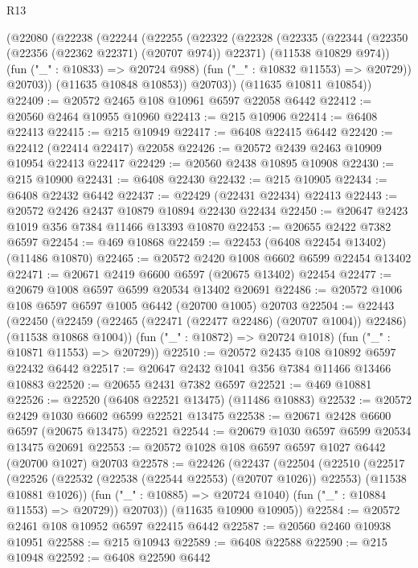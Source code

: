 \begin{lexlean}{R13}
\begin{coremodule}
    (@22080
      (@22238
        (@22244
          (@22255
            (@22322
              (@22328
                (@22335
                  (@22344
                    (@22350 (@22356 (@22362 @22371) (@20707 @974)) @22371)
                    (@11538 @10829 @974))
                  (fun ("_" : @10833) => @20724 @988)
                  (fun ("_" : @10832 @11553) => @20729))
                @20703))
            (@11635 @10848 @10853))
          @20703))
      (@11635 @10811 @10854))
@22409 := @20572 @2465 @108 @10961 @6597 @22058 @6442
@22412 := @20560 @2464 @10955 @10960
@22413 := @215 @10906
@22414 := @6408 @22413
@22415 := @215 @10949
@22417 := @6408 @22415 @6442
@22420 := @22412 (@22414 @22417) @22058
@22426 := @20572 @2439 @2463 @10909 @10954 @22413 @22417
@22429 := @20560 @2438 @10895 @10908
@22430 := @215 @10900
@22431 := @6408 @22430
@22432 := @215 @10905
@22434 := @6408 @22432 @6442
@22437 := @22429 (@22431 @22434) @22413
@22443 := @20572 @2426 @2437 @10879 @10894 @22430 @22434
@22450 := @20647 @2423 @1019 @356 @7384 @11466 @13393 @10870
@22453 := @20655 @2422 @7382 @6597
@22454 := @469 @10868
@22459 := @22453 (@6408 @22454 @13402) (@11486 @10870)
@22465 := @20572 @2420 @1008 @6602 @6599 @22454 @13402
@22471 := @20671 @2419 @6600 @6597 (@20675 @13402) @22454
@22477 := @20679 @1008 @6597 @6599 @20534 @13402 @20691
@22486 := @20572 @1006 @108 @6597 @6597 @1005 @6442 (@20700 @1005) @20703
@22504 := @22443
    (@22450
      (@22459 (@22465 (@22471 (@22477 @22486) (@20707 @1004)) @22486) (@11538 @10868 @1004))
      (fun ("_" : @10872) => @20724 @1018)
      (fun ("_" : @10871 @11553) => @20729))
@22510 := @20572 @2435 @108 @10892 @6597 @22432 @6442
@22517 := @20647 @2432 @1041 @356 @7384 @11466 @13466 @10883
@22520 := @20655 @2431 @7382 @6597
@22521 := @469 @10881
@22526 := @22520 (@6408 @22521 @13475) (@11486 @10883)
@22532 := @20572 @2429 @1030 @6602 @6599 @22521 @13475
@22538 := @20671 @2428 @6600 @6597 (@20675 @13475) @22521
@22544 := @20679 @1030 @6597 @6599 @20534 @13475 @20691
@22553 := @20572 @1028 @108 @6597 @6597 @1027 @6442 (@20700 @1027) @20703
@22578 := @22426
    (@22437
      (@22504
        (@22510
          (@22517
            (@22526 (@22532 (@22538 (@22544 @22553) (@20707 @1026)) @22553) (@11538 @10881 @1026))
            (fun ("_" : @10885) => @20724 @1040)
            (fun ("_" : @10884 @11553) => @20729))
          @20703))
      (@11635 @10900 @10905))
@22584 := @20572 @2461 @108 @10952 @6597 @22415 @6442
@22587 := @20560 @2460 @10938 @10951
@22588 := @215 @10943
@22589 := @6408 @22588
@22590 := @215 @10948
@22592 := @6408 @22590 @6442

\end{coremodule}
\end{lexlean}
